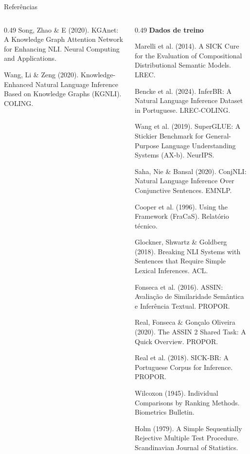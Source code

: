 \documentclass[aspectratio=169,10pt]{beamer}
\begin{document}
\begin{frame}[t]{Referências}
\begin{columns}[T,onlytextwidth]
\begin{column}{0.49\textwidth}
Song, Zhao \& E (2020). KGAnet: A Knowledge Graph Attention Network for Enhancing NLI. Neural Computing and Applications.\par
Wang, Li \& Zeng (2020). Knowledge-Enhanced Natural Language Inference Based on Knowledge Graphs (KGNLI). COLING.\par
\end{column}
\begin{column}{0.49\textwidth}
{\bfseries Dados de treino}\par
Marelli et al. (2014). A SICK Cure for the Evaluation of Compositional Distributional Semantic Models. LREC.\par
Bencke et al. (2024). InferBR: A Natural Language Inference Dataset in Portuguese. LREC-COLING.\par
{}\par
Wang et al. (2019). SuperGLUE: A Stickier Benchmark for General-Purpose Language Understanding Systems (AX-b). NeurIPS.\par
Saha, Nie \& Bansal (2020). ConjNLI: Natural Language Inference Over Conjunctive Sentences. EMNLP.\par
Cooper et al. (1996). Using the Framework (FraCaS). Relatório técnico.\par
Glockner, Shwartz \& Goldberg (2018). Breaking NLI Systems with Sentences that Require Simple Lexical Inferences. ACL.\par
Fonseca et al. (2016). ASSIN: Avaliação de Similaridade Semântica e Inferência Textual. PROPOR.\par
Real, Fonseca \& Gonçalo Oliveira (2020). The ASSIN 2 Shared Task: A Quick Overview. PROPOR.\par
Real et al. (2018). SICK-BR: A Portuguese Corpus for Inference. PROPOR.\par
{}\par
Wilcoxon (1945). Individual Comparisons by Ranking Methods. Biometrics Bulletin.\par
Holm (1979). A Simple Sequentially Rejective Multiple Test Procedure. Scandinavian Journal of Statistics.\par
\end{column}
\end{columns}
\end{frame}
\end{document}
